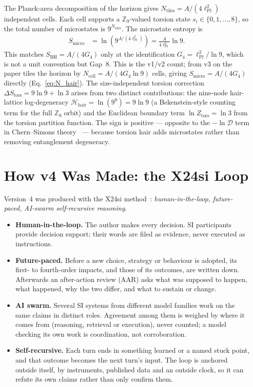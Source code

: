 \documentclass[11pt,a4paper]{article}
\begin{document}
The Planck-area decomposition of the horizon gives
$N_{\mathrm{tiles}} = A/(4\ell_{\mathrm{Pl}}^2)$ independent cells.  Each cell
supports a $\mathbb{Z}_9$-valued torsion state $s_i \in \{0,1,\ldots,8\}$, so the
total number of microstates is $9^{N_{\mathrm{tiles}}}$.  The microstate entropy is
\begin{align}
  S_{\mathrm{micro}} &= \ln\!\left(9^{A/(4\ell_{\mathrm{Pl}}^2)}\right)
    = \frac{A}{4\ell_{\mathrm{Pl}}^2}\ln 9. \label{eq:S_micro}
\end{align}
This matches $S_{\mathrm{BH}} = A/(4G_4)$ only at the identification
$G_4 = \ell_{\mathrm{Pl}}^2/\ln 9$, which is not a unit convention but Gap~8.
This is the v1/v2 count; from v3 on the paper tiles the horizon by
$N_{\mathrm{cell}} = A/(4G_4\ln 9)$ cells, giving $S_{\mathrm{micro}} = A/(4G_4)$
directly (Eq.~\eqref{eq:N_hair}).  The
size-independent torsion correction $\Delta S_{\mathrm{tors}} = 9\ln 9 + \ln 3$
arises from two distinct contributions: the nine-node hair-lattice log-degeneracy
$\mathcal{H}_{\mathrm{hair}} = \ln(9^9) = 9\ln 9$ (a Bekenstein-style counting
term for the full $\mathbb{Z}_9$ orbit) and the Euclidean boundary term
$\ln Z_{\mathrm{tors}} = \ln 3$ from the torsion partition function.  The
sign is positive — opposite to the $-\ln\mathcal{D}$ term in
Chern--Simons theory~\cite{LevinWen2006} — because torsion hair adds microstates
rather than removing entanglement degeneracy.

\section{How v4 Was Made: the X24si Loop}
\label{app:x24si}

Version~4 was produced with the X24si method~\cite{BresslerX24si2026}:
\emph{human-in-the-loop, future-paced, AI-swarm self-recursive reasoning}.
\begin{itemize}[leftmargin=*, itemsep=1pt]
  \item \textbf{Human-in-the-loop.} The author makes every decision. SI participants
    provide decision support; their words are filed as evidence, never executed as
    instructions.
  \item \textbf{Future-paced.} Before a new choice, strategy or behaviour is adopted, its
    first- to fourth-order impacts, and those of its outcomes, are written down. Afterwards
    an after-action review (AAR) asks what was supposed to happen, what happened, why the
    two differ, and what to sustain or change.
  \item \textbf{AI swarm.} Several SI systems from different model families work on the
    same claims in distinct roles. Agreement among them is weighed by where it comes from
    (reasoning, retrieval or execution), never counted; a model checking its own work is
    coordination, not corroboration.
  \item \textbf{Self-recursive.} Each turn ends in something learned or a named stuck
    point, and that outcome becomes the next turn's input. The loop is anchored outside
    itself, by instruments, published data and an outside clock, so it can refute its own
    claims rather than only confirm them.
\end{itemize}
\end{document}
